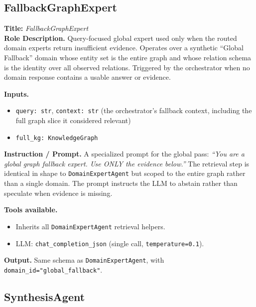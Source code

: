 \documentclass{article}
\begin{document}
\newpage
\subsection{FallbackGraphExpert}
\label{app:qa_fallback}

\begin{agentbox}
\textbf{Title:} \textit{FallbackGraphExpert}\\
\textbf{Role Description.} Query-focused global expert used only when
the routed domain experts return insufficient evidence. Operates over
a synthetic ``Global Fallback'' domain whose entity set is the entire
graph and whose relation schema is the identity over all observed
relations. Triggered by the orchestrator when no domain response
contains a usable answer or evidence.

\textbf{Inputs.}
\begin{itemize}[leftmargin=*,nosep]
\item \texttt{query: str}, \texttt{context: str} (the orchestrator's fallback context, including the full graph slice it considered relevant)
\item \texttt{full\_kg: KnowledgeGraph}
\end{itemize}

\textbf{Instruction / Prompt.} A specialized prompt for the global pass: \textit{``You are a global graph fallback expert. Use ONLY the evidence below.''} The retrieval step is identical in shape to \texttt{DomainExpertAgent} but scoped to the entire graph rather than a single domain. The prompt instructs the LLM to abstain rather than speculate when evidence is missing.

\textbf{Tools available.}
\begin{itemize}[leftmargin=*,nosep]
\item Inherits all \texttt{DomainExpertAgent} retrieval helpers.
\item LLM: \texttt{chat\_completion\_json} (single call, \texttt{temperature=0.1}).
\end{itemize}

\textbf{Output.} Same schema as \texttt{DomainExpertAgent}, with \texttt{domain\_id="global\_fallback"}.
\end{agentbox}

\newpage
\subsection{SynthesisAgent}
\label{app:qa_synthesis}
\end{document}
